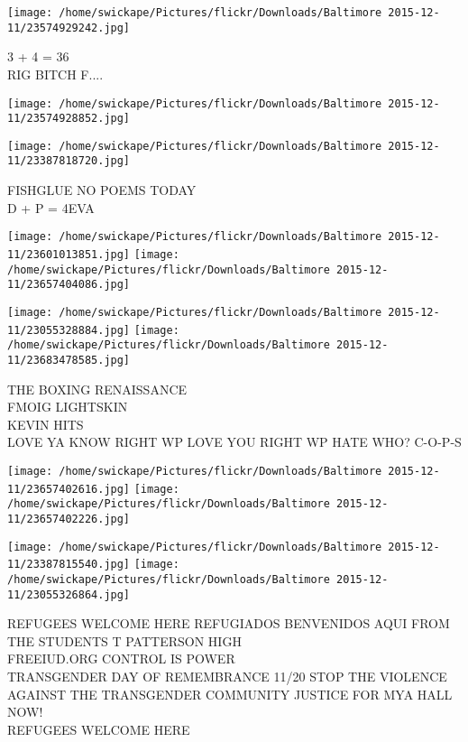 \documentclass[10pt,letterpaper]{article}
\begin{document}
\vspace{0.25in}
\texttt{[image: /home/swickape/Pictures/flickr/Downloads/Baltimore 2015-12-11/23574929242.jpg]}

3 + 4 = 36\\
RIG BITCH F....
\pagebreak

\texttt{[image: /home/swickape/Pictures/flickr/Downloads/Baltimore 2015-12-11/23574928852.jpg]}

\vspace{0.25in}
\texttt{[image: /home/swickape/Pictures/flickr/Downloads/Baltimore 2015-12-11/23387818720.jpg]}

FISHGLUE NO POEMS TODAY\\
D + P = 4EVA
\pagebreak

\texttt{[image: /home/swickape/Pictures/flickr/Downloads/Baltimore 2015-12-11/23601013851.jpg]}
\texttt{[image: /home/swickape/Pictures/flickr/Downloads/Baltimore 2015-12-11/23657404086.jpg]}

\texttt{[image: /home/swickape/Pictures/flickr/Downloads/Baltimore 2015-12-11/23055328884.jpg]}
\texttt{[image: /home/swickape/Pictures/flickr/Downloads/Baltimore 2015-12-11/23683478585.jpg]}

THE BOXING RENAISSANCE\\
FMOIG LIGHTSKIN\\
KEVIN HITS\\
LOVE YA KNOW RIGHT WP LOVE YOU RIGHT WP HATE WHO? C{-}O{-}P{-}S
\pagebreak

\texttt{[image: /home/swickape/Pictures/flickr/Downloads/Baltimore 2015-12-11/23657402616.jpg]}
\texttt{[image: /home/swickape/Pictures/flickr/Downloads/Baltimore 2015-12-11/23657402226.jpg]}

\texttt{[image: /home/swickape/Pictures/flickr/Downloads/Baltimore 2015-12-11/23387815540.jpg]}
\texttt{[image: /home/swickape/Pictures/flickr/Downloads/Baltimore 2015-12-11/23055326864.jpg]}

REFUGEES WELCOME HERE REFUGIADOS BENVENIDOS AQUI FROM THE STUDENTS T PATTERSON HIGH\\
FREEIUD.ORG CONTROL IS POWER\\
TRANSGENDER DAY OF REMEMBRANCE 11/20 STOP THE VIOLENCE AGAINST THE TRANSGENDER COMMUNITY JUSTICE FOR MYA HALL NOW!\\
REFUGEES WELCOME HERE
\pagebreak
\end{document}
